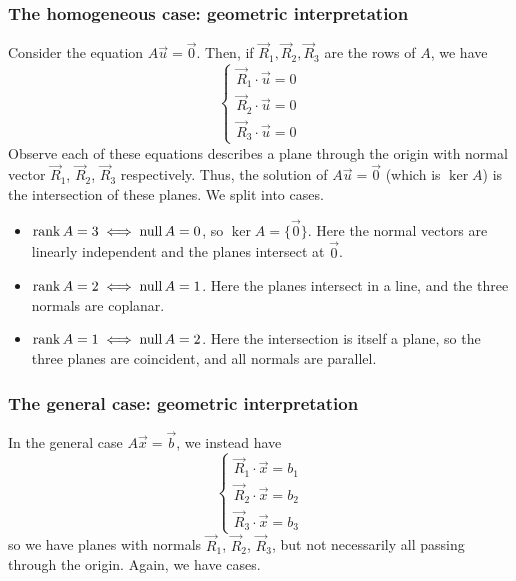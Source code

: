 \documentclass{../../template/note}
\begin{document}

    \subsubsection{The homogeneous case: geometric interpretation}

    Consider the equation \(A \vec u = \vec 0\). Then, if \(\vec R_1, \vec R_2, \vec R_3\) are the rows of \(A\), we have
    \[
        \begin{cases}
            \vec R_1 \cdot \vec u = 0 \\
            \vec R_2 \cdot \vec u = 0 \\
            \vec R_3 \cdot \vec u = 0
        \end{cases}
    \]
    Observe each of these equations describes a plane through the origin with normal vector \(\vec R_1\), \(\vec R_2\), \(\vec R_3\) respectively. Thus, the solution of \(A \vec u = \vec 0\) (which is \(\ker A\)) is the intersection of these planes. We split into cases.
    \begin{itemize}
        \item \(\operatorname{rank} A = 3 \iff \operatorname{null} A = 0\), so \(\ker A = \{\vec 0\}\). Here the normal vectors are linearly independent and the planes intersect at \(\vec 0\).
        \item \(\operatorname{rank} A = 2 \iff \operatorname{null} A = 1\). Here the planes intersect in a line, and the three normals are coplanar.
        \item \(\operatorname{rank} A = 1 \iff \operatorname{null} A = 2\). Here the intersection is itself a plane, so the three planes are coincident, and all normals are parallel.
    \end{itemize}
    
    \subsubsection{The general case: geometric interpretation}

    In the general case \(A \vec x = \vec b\), we instead have
    \[
        \begin{cases}
            \vec R_1 \cdot \vec x = b_1 \\
            \vec R_2 \cdot \vec x = b_2 \\
            \vec R_3 \cdot \vec x = b_3
        \end{cases}
    \]
    so we have planes with normals \(\vec R_1\), \(\vec R_2\), \(\vec R_3\), but not necessarily all passing through the origin. Again, we have cases.
\end{document}
